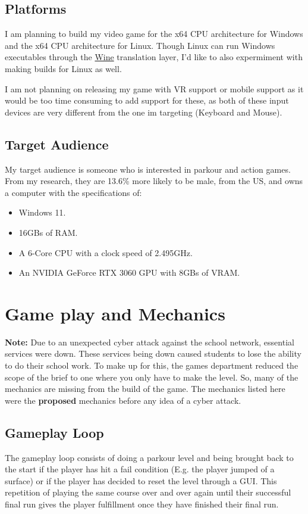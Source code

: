 \documentclass[12pt]{article}
\begin{document}
	\subsection{Platforms}
	I am planning to build my video game for the x64 CPU architecture for Windows and the x64 CPU architecture for Linux. Though Linux can run Windows executables through the \href{https://www.winehq.org}{Wine} translation layer, I'd like to also expermiment with making builds for Linux as well.
	
	I am not planning on releasing my game with VR support or mobile support as it would be too time consuming to add support for these, as both of these input devices are very different from the one im targeting (Keyboard and Mouse).
	
	\newpage
	\subsection{Target Audience}
	My target audience is someone who is interested in parkour and action games. From my research, they are 13.6\% more likely to be male, \cite{gameTreeIndustryReports} from the US, \cite{gameDiscoverCoCountryBreakdown} and owns a computer with the specifications of:
	\begin{itemize}
		\item Windows 11.
		\item 16GBs of RAM.
		\item A 6-Core CPU with a clock speed of 2.495GHz.
		\item An NVIDIA GeForce RTX 3060 GPU with 8GBs of VRAM.
	\end{itemize} \cite{steamHardwareSurvey}
	
	\section{Game play and Mechanics}
	\begin{note}
		\textbf{Note:} Due to an unexpected cyber attack against the school network, essential services were down. These services being down caused students to lose the ability to do their school work. To make up for this, the games department reduced the scope of the brief to one where you only have to make the level. So, many of the mechanics are missing from the build of the game. The mechanics listed here were the \textbf{proposed} mechanics before any idea of a cyber attack.
	\end{note}
	\subsection{Gameplay Loop}
	The gameplay loop consists of doing a parkour level and being brought back to the start if the player has hit a fail condition (E.g. the player jumped of a surface) or if the player has decided to reset the level through a GUI. This repetition of playing the same course over and over again until their successful final run gives the player fulfillment once they have finished their final run.
	\newpage
\end{document}
